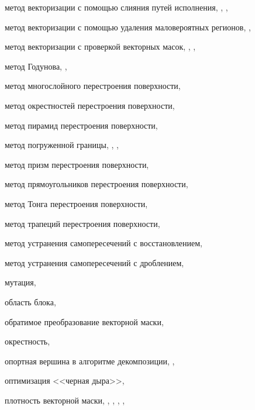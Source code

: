 метод векторизации с помощью слияния путей исполнения, \pageref{term:meth_vec_merge}, \pageref{term:meth_vec_merge2}, \pageref{term:meth_vec_merge3}

метод векторизации с помощью удаления маловероятных регионов, \pageref{term:meth_vec_del_low_prob_regions}, \pageref{term:meth_vec_del_low_prob_regions2}

метод векторизации с проверкой векторных масок, \pageref{term:meth_vec_check}, \pageref{term:meth_vec_check2}, \pageref{term:meth_vec_check3}

метод Годунова, \pageref{term:godunov_method}, \pageref{term:godunov_method2}

метод многослойного перестроения поверхности, \pageref{term:method_remesh_multi}

метод окрестностей перестроения поверхности, \pageref{term:method_remesh_okr}

метод пирамид перестроения поверхности, \pageref{term:method_remesh_pyramid}

метод погруженной границы, \pageref{term:immersed_boundary_method}, \pageref{term:immersed_boundary_method2}, \pageref{term:immersed_boundary_method3}

метод призм перестроения поверхности, \pageref{term:method_remesh_prism}

метод прямоугольников перестроения поверхности, \pageref{term:method_remesh_rect}

метод Тонга перестроения поверхности, \pageref{term:method_remesh_tong}

метод трапеций перестроения поверхности, \pageref{term:method_remesh_trap}

метод устранения самопересечений с восстановлением, \pageref{term:method_selfint_repare}

метод устранения самопересечений с дроблением, \pageref{term:method_selfint_cut}

мутация, \pageref{term:mutation}

область блока, \pageref{term:block_scope}

обратимое преобразование векторной маски, \pageref{term:obratim_preobr}

окрестность, \pageref{term:okrestnost}

опортная вершина в алгоритме декомпозиции, \pageref{term:opor_point}, \pageref{term:opor_point2}

оптимизация <<черная дыра>>, \pageref{term:blackhome_optimization}

плотность векторной маски, \pageref{term:vector_mask_density}, \pageref{term:vector_mask_density2}, \pageref{term:vector_mask_density3}, \pageref{term:vector_mask_density4}, \pageref{term:vector_mask_density5}

